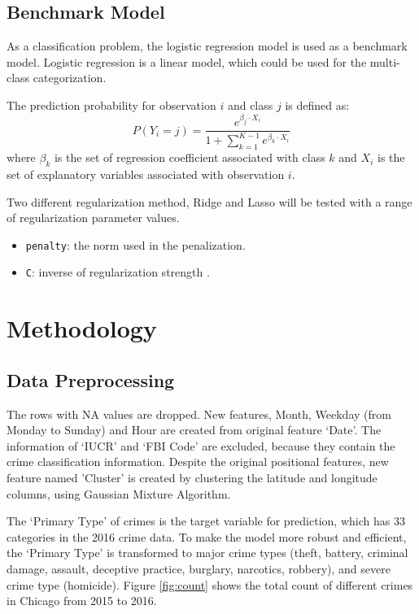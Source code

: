 \documentclass[12pt]{article}
\begin{document}
\subsection{Benchmark Model}
As a classification problem, the logistic regression model is used as a benchmark model. Logistic regression is a linear model, which could be used for the multi-class categorization. 

The prediction probability for observation $i$ and class $j$ is defined as:
\begin{equation}
P(Y_i = j) = \frac{e^{\beta_j \cdot X_i}}{1+\sum_{k=1}^{K-1}e^{\beta_k \cdot X_i} }
\end{equation}
where $\beta_k$ is the set of regression coefficient associated with class $k$ and $X_i$ is the set of explanatory variables associated with observation $i$.

Two different regularization method, Ridge and Lasso will be tested with a range of regularization parameter values.
\begin{itemize}
\item \verb|penalty|: the norm used in the penalization.
\item \verb|C|: inverse of regularization strength .
\end{itemize}

\section{Methodology}
\subsection{Data Preprocessing}
The rows with NA values are dropped. New features, Month, Weekday (from Monday to Sunday) and Hour are created from original feature ‘Date’. The information of ‘IUCR’ and ‘FBI Code’ are excluded, because they contain the crime classification information. Despite the original positional features, new feature named 'Cluster' is created by clustering the latitude and longitude columns, using Gaussian Mixture Algorithm. 

The ‘Primary Type’ of crimes is the target variable for prediction, which has 33 categories in the 2016 crime data. To make the model more robust and efficient, the ‘Primary Type’ is transformed to major crime types (theft, battery, criminal damage, assault, deceptive practice, burglary, narcotics, robbery), and severe crime type (homicide). Figure \ref{fig:count} shows the total count of different crimes in Chicago from 2015 to 2016.
\end{document}
